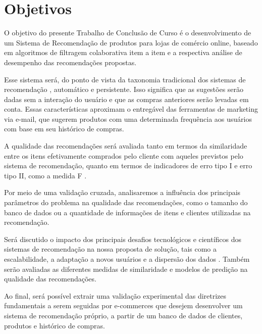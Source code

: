 \chapter[Objetivos]{Objetivos}
\label{chap:objetivos}

O objetivo do presente Trabalho de Conclusão de Curso é o desenvolvimento de um Sistema de Recomendação de produtos para lojas de comércio online, baseado em algoritmos de filtragem colaborativa item a item e a respectiva análise de desempenho das recomendações propostas. 

Esse sistema será, do ponto de vista da taxonomia tradicional dos sistemas de recomendação \cite{schafer1999recommender, wei2007survey}, automático e persistente. Isso significa que as sugestões serão dadas sem a interação do usuário e que as compras anteriores serão levadas em conta. Essas características aproximam o entregável das ferramentas de marketing via e-mail, que sugerem produtos com uma determinada frequência aos usuários com base em seu histórico de compras. 

A qualidade das recomendações será avaliada tanto em termos da similaridade entre os itens efetivamente comprados pelo cliente com aqueles previstos pelo sistema de recomendação, quanto em termos de indicadores de erro tipo I e erro tipo II, como a medida F \cite{sarwar2000analysis}. 

Por meio de uma validação cruzada, analisaremos a influência dos principais parâmetros do problema na qualidade das recomendações, como o tamanho do banco de dados ou a quantidade de informações de itens e clientes utilizadas na recomendação. 

Será discutido o impacto dos principais desafios tecnológicos e científicos dos sistemas de recomendação na nossa proposta de solução, tais como a escalabilidade, a adaptação a novos usuários e a dispersão dos dados \cite{wei2007survey}. Também serão avaliadas as diferentes medidas de similaridade e modelos de predição na qualidade das recomendações. 

Ao final, será possível extrair uma validação experimental das diretrizes fundamentais a serem seguidas por e-commerces que desejem desenvolver um sistema de recomendação próprio, a partir de um banco de dados de clientes, produtos e histórico de compras. 